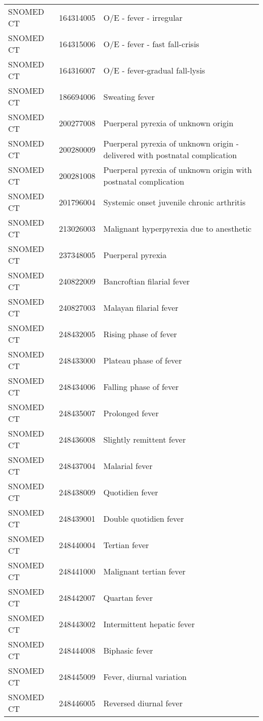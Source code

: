\begin{longtable}{p{}p{}p{}}
  SNOMED CT & 164314005 & O/E - fever - irregular \\ 
  SNOMED CT & 164315006 & O/E - fever - fast fall-crisis \\ 
  SNOMED CT & 164316007 & O/E - fever-gradual fall-lysis \\ 
  SNOMED CT & 186694006 & Sweating fever \\ 
  SNOMED CT & 200277008 & Puerperal pyrexia of unknown origin \\ 
  SNOMED CT & 200280009 & Puerperal pyrexia of unknown origin - delivered with postnatal complication \\ 
  SNOMED CT & 200281008 & Puerperal pyrexia of unknown origin with postnatal complication \\ 
  SNOMED CT & 201796004 & Systemic onset juvenile chronic arthritis \\ 
  SNOMED CT & 213026003 & Malignant hyperpyrexia due to anesthetic \\ 
  SNOMED CT & 237348005 & Puerperal pyrexia \\ 
  SNOMED CT & 240822009 & Bancroftian filarial fever \\ 
  SNOMED CT & 240827003 & Malayan filarial fever \\ 
  SNOMED CT & 248432005 & Rising phase of fever \\ 
  SNOMED CT & 248433000 & Plateau phase of fever \\ 
  SNOMED CT & 248434006 & Falling phase of fever \\ 
  SNOMED CT & 248435007 & Prolonged fever \\ 
  SNOMED CT & 248436008 & Slightly remittent fever \\ 
  SNOMED CT & 248437004 & Malarial fever \\ 
  SNOMED CT & 248438009 & Quotidien fever \\ 
  SNOMED CT & 248439001 & Double quotidien fever \\ 
  SNOMED CT & 248440004 & Tertian fever \\ 
  SNOMED CT & 248441000 & Malignant tertian fever \\ 
  SNOMED CT & 248442007 & Quartan fever \\ 
  SNOMED CT & 248443002 & Intermittent hepatic fever \\ 
  SNOMED CT & 248444008 & Biphasic fever \\ 
  SNOMED CT & 248445009 & Fever, diurnal variation \\ 
  SNOMED CT & 248446005 & Reversed diurnal fever \\ 

\end{longtable}
